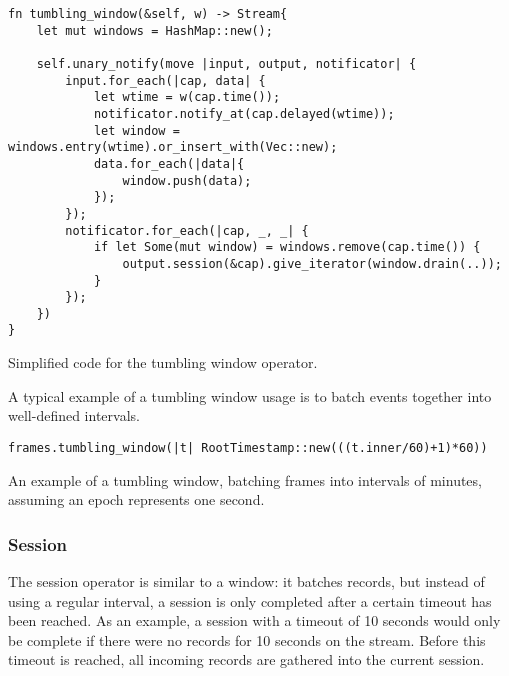 \begin{listing}[H]
\begin{verbatim}
fn tumbling_window(&self, w) -> Stream{
    let mut windows = HashMap::new();
    
    self.unary_notify(move |input, output, notificator| {
        input.for_each(|cap, data| {
            let wtime = w(cap.time());
            notificator.notify_at(cap.delayed(wtime));
            let window = windows.entry(wtime).or_insert_with(Vec::new);
            data.for_each(|data|{
                window.push(data);
            });
        });
        notificator.for_each(|cap, _, _| {
            if let Some(mut window) = windows.remove(cap.time()) {
                output.session(&cap).give_iterator(window.drain(..));
            }
        });
    })
}
\end{verbatim}
  \caption{Simplified code for the tumbling window operator.}
  \label{lst:tumbling-window}
\end{listing}

A typical example of a tumbling window usage is to batch events together into well-defined intervals.

\begin{listing}[H]
\begin{verbatim}
frames.tumbling_window(|t| RootTimestamp::new(((t.inner/60)+1)*60))
\end{verbatim}
\caption{An example of a tumbling window, batching frames into intervals of minutes, assuming an epoch represents one second.}
\label{lst:tumbling-window-example}
\end{listing}

\subsubsection{Session}
The session operator is similar to a window: it batches records, but instead of using a regular interval, a session is only completed after a certain timeout has been reached. As an example, a session with a timeout of 10 seconds would only be complete if there were no records for 10 seconds on the stream. Before this timeout is reached, all incoming records are gathered into the current session.

